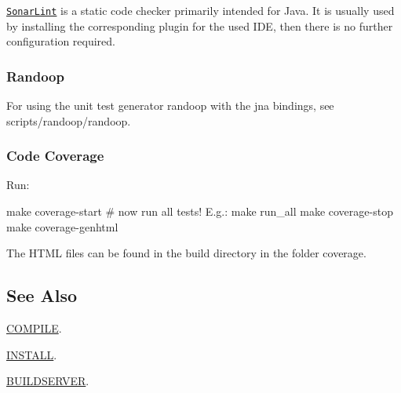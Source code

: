 \href{http://www.sonarlint.org/}{\tt Sonar\+Lint} is a static code checker primarily intended for Java. It is usually used by installing the corresponding plugin for the used I\+DE, then there is no further configuration required.

\subsubsection*{Randoop}

For using the unit test generator randoop with the jna bindings, see {\ttfamily scripts/randoop/randoop}.

\subsubsection*{Code Coverage}

Run\+:


\begin{DoxyCode}
make coverage-start
# now run all tests! E.g.:
make run\_all
make coverage-stop
make coverage-genhtml
\end{DoxyCode}


The H\+T\+ML files can be found in the build directory in the folder {\ttfamily coverage}.

\subsection*{See Also}


\begin{DoxyItemize}
\item \hyperlink{doc_COMPILE_md}{C\+O\+M\+P\+I\+LE}.
\item \hyperlink{doc_INSTALL_md}{I\+N\+S\+T\+A\+LL}.
\item \hyperlink{doc_BUILDSERVER_md}{B\+U\+I\+L\+D\+S\+E\+R\+V\+ER}. 
\end{DoxyItemize}